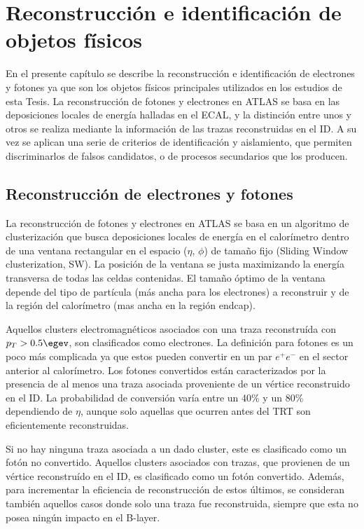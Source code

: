 \chapter{Reconstrucción e identificación de objetos físicos}



En el presente capítulo se describe la reconstrucción e identificación de electrones y fotones ya que son los objetos físicos principales utilizados en los estudios de esta Tesis.
La reconstrucción de fotones y electrones en ATLAS se basa en las deposiciones locales de energía halladas en el ECAL, y la distinción entre unos y otros se   realiza mediante la información de las trazas reconstruidas en el ID. A su vez se aplican una serie de criterios de identificación y aislamiento, que permiten discriminarlos de falsos candidatos, o de procesos secundarios que los producen.

\section{Reconstrucción de electrones y fotones}

La  reconstrucción de fotones y electrones en ATLAS se basa en un algoritmo de clusterización \cite{Lampl:1099735} que busca deposiciones locales de energía en el calorímetro dentro de una ventana rectangular en el espacio ($\eta$, $\phi$) de tamaño fijo (Sliding Window clusterization, SW). La posición de la ventana se  justa maximizando la energía transversa de todas las celdas contenidas. El tamaño óptimo de la ventana depende del tipo de partícula (más ancha para los electrones) a reconstruir y de la región del calorímetro (mas ancha en la región endcap). 

Aquellos clusters electromagnéticos asociados con una traza reconstruída con $p_{T} > 0.5 \egev$, son clasificados como electrones. La definición para fotones es un poco más complicada ya que estos pueden convertir en un par $e^{+}e^{-}$ en el sector anterior al calorímetro. Los fotones convertidos están caracterizados por la presencia de al menos una traza asociada proveniente de un vértice reconstruido en el ID. La probabilidad de conversión varía entre un 40\% y un 80\% dependiendo de $\eta$, aunque solo aquellas que ocurren antes del TRT son eficientemente reconstruidas. 

Si no hay ninguna traza asociada a un dado cluster, este es clasificado como un fotón no convertido. Aquellos clusters asociados con trazas, que provienen de un vértice reconstruído en el ID, es clasificado como un fotón convertido. Además, para incrementar la eficiencia de reconstrucción de estos últimos, se consideran también aquellos casos donde solo una traza fue reconstruida, siempre que esta no posea ningún impacto en el B-layer.

